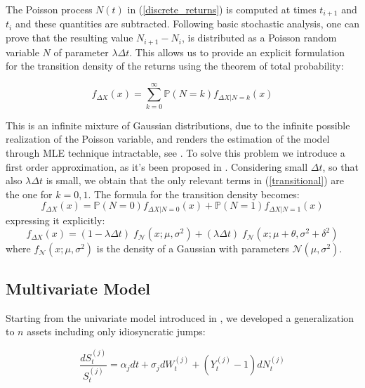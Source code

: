 The Poisson process $N(t)$ in (\ref{discrete_returns}) is computed at times $t_{i+1}$ and $t_i$ and these quantities are subtracted. Following basic stochastic analysis, one can prove that the resulting value $N_{i+1} - N_i$,  is distributed as a Poisson random variable $N$ of parameter $\lambda \Delta t$.
This allows us to provide an explicit formulation for the transition density of the returns using the theorem of total probability:

\begin{equation}
\label{transitional}
f_{\Delta X} (x) = \sum_{k=0}^{\infty} \mathbb{P}(N = k) f_{\Delta X | N = k}(x) 
\end{equation}

This is an infinite mixture of Gaussian distributions, due to the infinite possible realization of the Poisson variable, and renders the estimation of the model through MLE technique intractable, see \cite{HONORE1998}.
To solve this problem we introduce a first order approximation, as it's been proposed in \cite{BALLTOROUS1983}. Considering small $\Delta t$, so that also $\lambda \Delta t $ is small, we obtain that the only relevant terms in (\ref{transitional}) are the one for $ k = 0, 1$.
The formula for the transition density becomes:
\begin{equation*}
f_{\Delta X} (x) = \mathbb{P}(N = 0) f_{\Delta X | N = 0}(x) + \mathbb{P}(N = 1) f_{\Delta X | N = 1}(x)
\end{equation*}
expressing it explicitly:
\begin{equation}
f_{\Delta X} (x) = (1 - \lambda \Delta t) \;f_{\mathcal{N}}(x ; \mu, \sigma^2) + (\lambda \Delta t)\; f_{\mathcal{N}}(x ; \mu + \theta, \sigma^2+\delta^2)
\end{equation}
where $f_{\mathcal{N}}(x ; \mu, \sigma^2)$ is the density of a Gaussian with parameters $\mathcal{N}(\mu, \sigma^2)$.


\subsection{Multivariate Model}
Starting from the univariate model introduced in \cite{MERTON1976}, we developed a generalization to $n$ assets including only idiosyncratic jumps:

\begin{equation}
\frac{dS_t^{(j)}}{S_t^{(j)}} = \alpha_j dt + \sigma_j dW_t^{(j)} + (Y^{(j)}_t -1) dN^{(j)}_t
\end{equation}


